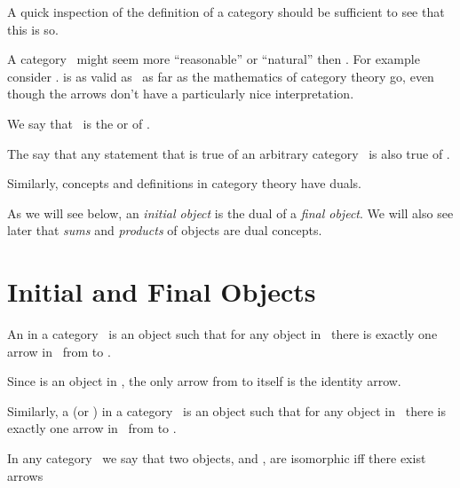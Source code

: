 \documentclass{seminar}
\newcommand{\vs}{\vspace{0.3in}}
\newcommand{\CC}{\tm{\cal C}}
\newcommand{\COP}{\tm{\cal C^\mathrm{op}}}
\begin{document}
\begin{slide}
A quick inspection of the definition of a category should be
sufficient
to see that this is so.

A category \CC \, might seem
more ``reasonable'' or ``natural'' then \COP.  For example
consider .   is as valid
as \, as far as the mathematics of category theory go,
even though
the arrows don't have a particularly nice interpretation.

We say that \COP \, is the  or 
of \CC.

\newslide

The  say that any statement that is
true of
an arbitrary category \CC \, is also true of \COP.

\vs

Similarly, concepts and definitions in category theory have duals.

\vs

As we will see below, an \textit{initial object} is the dual of a
\textit{final object}.  We will also see later that \textit{sums}
and
\textit{products} of objects are dual concepts.


\newslide

\section*{Initial and Final Objects}

An  in a category \CC \, is an object
 such that for any object  in \CC \, there is exactly
one arrow in \CC \, from  to .

\vs

Since  is an object in \CC, the only arrow from  to
itself
is the identity arrow.

\vs

Similarly, a  (or )
in a category \CC \, is an object
 such that for any object  in \CC \, there is exactly
one arrow in \CC \, from  to .

\newslide

In any category \CC \, we say that two objects,  and ,
are
isomorphic iff there
exist arrows

\begin{codenott}
\\
\end{codenott}


\end{slide}
\end{document}
